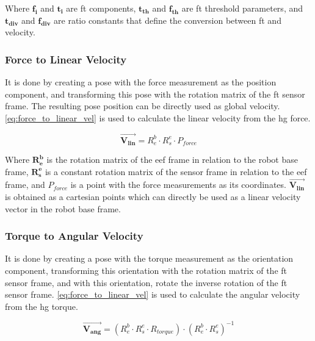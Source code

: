 \noindent Where $\mathbf{f_i}$ and $\mathbf{t_i}$ are \ac{ft} components, $\mathbf{t_{th}}$ and $\mathbf{f_{th}}$ are \ac{ft} threshold parameters, and $\mathbf{t_{div}}$ and $\mathbf{f_{div}}$ are ratio constants that define the conversion between \ac{ft} and velocity.

\subsubsection{Force to Linear Velocity}

\par It is done by creating a pose with the force measurement as the position component, and transforming this pose with the rotation matrix of the \ac{ft} sensor frame. The resulting pose position can be directly used as global velocity. \autoref{eq:force_to_linear_vel} is used to calculate the linear velocity from the \ac{hg} force.

\begin{equation}
    \vec{\mathbf{V_{lin}}} = R^b_e \cdot R^e_s \cdot P_{force}
    \label{eq:force_to_linear_vel}
\end{equation}

\noindent Where $\mathbf{R^b_e}$ is the rotation matrix of the \ac{eef} frame in relation to the robot base frame, $\mathbf{R^e_s}$ is a constant rotation matrix of the sensor frame in relation to the \ac{eef} frame, and $P_{force}$ is a point with the force measurements as its coordinates. $\vec{\mathbf{V_{lin}}}$ is obtained as a cartesian points which can directly be used as a linear velocity vector in the robot base frame.

\subsubsection{Torque to Angular Velocity}

\par It is done by creating a pose with the torque measurement as the orientation component, transforming this orientation with the rotation matrix of the \ac{ft} sensor frame, and with this orientation, rotate the inverse rotation of the \ac{ft} sensor frame. \autoref{eq:force_to_linear_vel} is used to calculate the angular velocity from the \ac{hg} torque.

\begin{equation}
    \vec{\mathbf{V_{ang}}} = (R^b_e \cdot R^e_s \cdot R_{torque}) \cdot (R^b_e \cdot R^e_s)^{-1}
    \label{eq:torque_to_angular_vel}
\end{equation}

